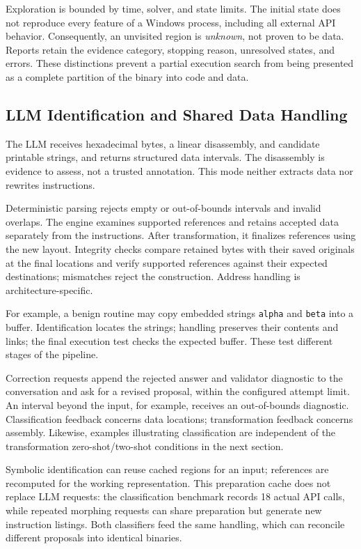 Exploration is bounded by time, solver, and state limits. The initial state
does not reproduce every feature of a Windows process, including all
external API behavior. Consequently, an unvisited region is \emph{unknown},
not proven to be data. Reports retain the evidence category, stopping
reason, unresolved states, and errors. These distinctions prevent a
partial execution search from being presented as a complete partition of
the binary into code and data.

\subsection{LLM Identification and Shared Data Handling}
The LLM receives hexadecimal bytes, a linear disassembly, and candidate
printable strings, and returns structured data intervals. The disassembly
is evidence to assess, not a trusted annotation. This mode neither
extracts data nor rewrites instructions.

Deterministic parsing rejects empty or out-of-bounds intervals and invalid
overlaps. The engine examines supported references and retains accepted
data separately from the instructions. After transformation, it finalizes
references using the new layout. Integrity checks compare retained bytes
with their saved originals at the final locations and verify supported
references against their expected destinations; mismatches reject the
construction. Address handling is architecture-specific.

For example, a benign routine may copy embedded strings \texttt{alpha}
and \texttt{beta} into a buffer. Identification locates the strings;
handling preserves their contents and links; the final execution test
checks the expected buffer. These test different stages of the pipeline.

Correction requests append the rejected answer and validator diagnostic
to the conversation and ask for a revised proposal, within the configured
attempt limit. An interval beyond the input, for example, receives an
out-of-bounds diagnostic. Classification feedback concerns data locations;
transformation feedback concerns assembly. Likewise, examples illustrating
classification are independent of the transformation zero-shot/two-shot
conditions in the next section.

Symbolic identification can reuse cached regions for an input; references
are recomputed for the working representation. This preparation cache
does not replace LLM requests: the classification benchmark records
18 actual API calls, while repeated morphing requests can share preparation
but generate new instruction listings. Both classifiers feed the same
handling, which can reconcile different proposals into identical binaries.
